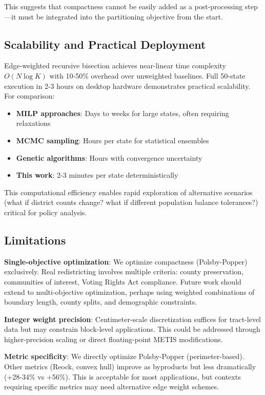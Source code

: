 This suggests that compactness cannot be easily added as a post-processing step—it must be integrated into the partitioning objective from the start.

\subsection{Scalability and Practical Deployment}

Edge-weighted recursive bisection achieves near-linear time complexity $O(N \log K)$ with 10-50\% overhead over unweighted baselines. Full 50-state execution in 2-3 hours on desktop hardware demonstrates practical scalability. For comparison:
\begin{itemize}
    \item \textbf{MILP approaches}: Days to weeks for large states, often requiring relaxations
    \item \textbf{MCMC sampling}: Hours per state for statistical ensembles
    \item \textbf{Genetic algorithms}: Hours with convergence uncertainty
    \item \textbf{This work}: 2-3 minutes per state deterministically
\end{itemize}

This computational efficiency enables rapid exploration of alternative scenarios (what if district counts change? what if different population balance tolerances?) critical for policy analysis.

\subsection{Limitations}

\textbf{Single-objective optimization}: We optimize compactness (Polsby-Popper) exclusively. Real redistricting involves multiple criteria: county preservation, communities of interest, Voting Rights Act compliance. Future work should extend to multi-objective optimization, perhaps using weighted combinations of boundary length, county splits, and demographic constraints.

\textbf{Integer weight precision}: Centimeter-scale discretization suffices for tract-level data but may constrain block-level applications. This could be addressed through higher-precision scaling or direct floating-point METIS modifications.

\textbf{Metric specificity}: We directly optimize Polsby-Popper (perimeter-based). Other metrics (Reock, convex hull) improve as byproducts but less dramatically (+28-34\% vs +56\%). This is acceptable for most applications, but contexts requiring specific metrics may need alternative edge weight schemes.

